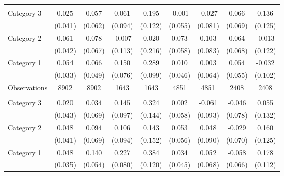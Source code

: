 {\begin{longtable}{l*{8}{c}}
\midrule
\addlinespace
\multicolumn{9}{l}{\textit{Panel B: Goods index}} \\
\addlinespace
Category 3&    0.025         &    0.057         &    0.061         &    0.195         &   -0.001         &   -0.027         &    0.066         &    0.136         \\
                &  (0.041)         &  (0.062)         &  (0.094)         &  (0.122)         &  (0.055)         &  (0.081)         &  (0.069)         &  (0.125)         \\
\addlinespace
Category 2&    0.061         &    0.078         &   -0.007         &    0.020         &    0.073         &    0.103         &    0.064         &   -0.013         \\
                &  (0.042)         &  (0.067)         &  (0.113)         &  (0.216)         &  (0.058)         &  (0.083)         &  (0.068)         &  (0.122)         \\
\addlinespace
Category 1&    0.054         &    0.066         &    0.150\sym{**} &    0.289\sym{***}&    0.010         &    0.003         &    0.054         &   -0.032         \\
                &  (0.033)         &  (0.049)         &  (0.076)         &  (0.099)         &  (0.046)         &  (0.064)         &  (0.055)         &  (0.102)         \\

\midrule
Observations    &     8902         &     8902         &     1643         &     1643         &     4851         &     4851         &     2408         &     2408         \\



\midrule
\addlinespace
\multicolumn{9}{l}{\textit{Panel C: Time index}} \\
\addlinespace
Category 3&    0.020         &    0.034         &    0.145         &    0.324\sym{**} &    0.002         &   -0.061         &   -0.046         &    0.055         \\
                &  (0.043)         &  (0.069)         &  (0.097)         &  (0.144)         &  (0.058)         &  (0.093)         &  (0.078)         &  (0.132)         \\
\addlinespace
Category 2&    0.048         &    0.094         &    0.106         &    0.143         &    0.053         &    0.048         &   -0.029         &    0.160         \\
                &  (0.041)         &  (0.069)         &  (0.094)         &  (0.152)         &  (0.056)         &  (0.090)         &  (0.070)         &  (0.125)         \\
\addlinespace
Category 1&    0.048         &    0.140\sym{**} &    0.227\sym{***}&    0.384\sym{***}&    0.034         &    0.052         &   -0.058         &    0.178         \\
                &  (0.035)         &  (0.054)         &  (0.080)         &  (0.120)         &  (0.045)         &  (0.068)         &  (0.066)         &  (0.112)         \\


\end{longtable}}
